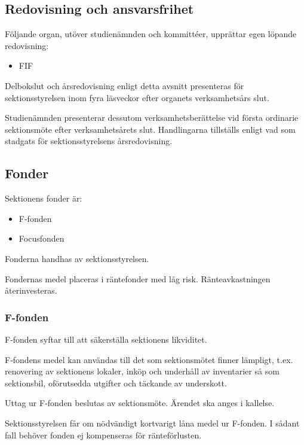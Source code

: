 \documentclass{styrdokument}
\begin{document}
\subsection{Redovisning och ansvarsfrihet}
\? Följande organ, utöver studienämnden och kommittéer, upprättar egen löpande redovisning:
\begin{itemize}
    \item FIF
\end{itemize}

\? Delbokslut och årsredovisning enligt detta avsnitt presenteras för sektionsstyrelsen inom fyra läsveckor efter organets verksamhetsårs slut.

\? Studienämnden presenterar dessutom verksamhetsberättelse vid första ordinarie sektionsmöte efter verksamhetsårets slut.
Handlingarna tillställs enligt vad som stadgats för sektionsstyrelsens årsredovisning.


\subsection{Fonder}
\? Sektionens fonder är:
\begin{itemize}
    \item F-fonden
    \item Focusfonden
\end{itemize}

\? Fonderna handhas av sektionsstyrelsen.

\? Fondernas medel placeras i räntefonder med låg risk.
Ränteavkastningen återinvesteras.

\subsubsection{F-fonden}
\? F-fonden syftar till att säkerställa sektionens likviditet.

\? F-fondens medel kan användas till det som sektionsmötet finner lämpligt, t.ex. renovering av sektionens lokaler, inköp och underhåll av inventarier så som sektionsbil, oförutsedda utgifter och täckande av underskott.

\? Uttag ur F-fonden beslutas av sektionsmöte.
Ärendet ska anges i kallelse.

\? Sektionsstyrelsen får om nödvändigt kortvarigt låna medel ur F-fonden.
I sådant fall behöver fonden ej kompenseras för ränteförlusten.

\end{document}
